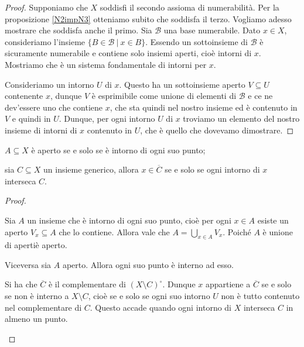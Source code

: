\documentclass{article}
\begin{document}
\begin{proof}
	Supponiamo che $X$ soddisfi il secondo assioma di numerabilità. Per la
	proposizione \ref{N2impN3} otteniamo subito che soddisfa il terzo. Vogliamo
	adesso mostrare che soddisfa anche il primo. Sia $\mathcal{B}$ una base
	numerabile. Dato $x \in X$, consideriamo l'insieme ${\{ B \in \mathcal{B}\
	|\ x \in B \}}$. Essendo un sottoinsieme di $\mathcal{B}$ è sicuramente
	numerabile e contiene solo insiemi aperti, cioè intorni di $x$. Mostriamo
	che è un sistema fondamentale di intorni per $x$.

	Consideriamo un intorno $U$ di $x$. Questo ha un sottoinsieme aperto $V
	\subseteq U$ contenente $x$, dunque $V$ è esprimibile come unione di
	elementi di $\mathcal{B}$ e ce ne dev'essere uno che contiene $x$, che sta
	quindi nel nostro insieme ed è contenuto in $V$ e quindi in $U$. Dunque, per
	ogni intorno $U$ di $x$ troviamo un elemento del nostro insieme di intorni
	di $x$ contenuto in $U$, che è quello che dovevamo dimostrare.
\end{proof}

\begin{prop}
	\begin{nlist}
		\item $A \subseteq X$ è aperto se e solo se è intorno di ogni suo punto;
		\item sia $C \subseteq X$ un insieme generico, allora $x \in
		\overline{C}$ se e solo se ogni intorno di $x$ interseca $C$.
	\end{nlist}
\end{prop}

\begin{proof}
    \begin{nlist}
        \item Sia $A$ un insieme che \`e intorno di ogni suo punto, cio\`e per
        ogni $x \in A$ esiste un aperto $V_x \subseteq A$ che lo contiene.
        Allora vale che $\displaystyle A = \bigcup_{x \in A} V_x$. Poiché $A$
        \`e unione di aperti\`e aperto.

        Viceversa sia $A$ aperto. Allora ogni suo punto \`e interno ad esso.

        \item Si ha che $\overline{C}$ \`e il complementare di $(X\setminus
        C)^\circ$. Dunque $x$ appartiene a $\overline{C}$ se e solo se non \`e
        interno a $X \setminus C$, cioè se e solo se ogni suo intorno $U$ non
        \`e tutto contenuto nel complementare di $C$. Questo accade quando ogni
        intorno di $X$ interseca $C$ in almeno un punto.
    \end{nlist}
\end{proof}
\end{document}
